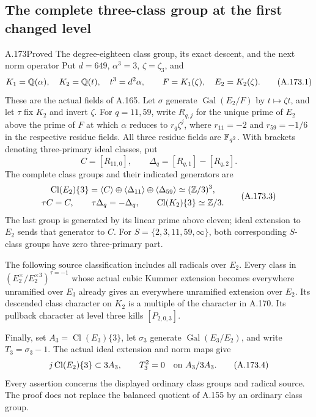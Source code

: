\subsection{The complete three-class group at the first changed level}

\begin{statement}{A.173}{Proved}
{The degree-eighteen class group, its exact descent, and the next norm operator}
Put \(d=649\), \(\alpha^3=3\), \(\zeta=\zeta_3\), and
\[
 K_1=\mathbb Q(\alpha),\quad K_2=\mathbb Q(t),\quad t^3=d^2\alpha,
 \qquad F=K_1(\zeta),\quad E_2=K_2(\zeta).
\tag{A.173.1}
\]
These are the actual fields of A.165.  Let \(\sigma\) generate
\(\operatorname{Gal}(E_2/F)\) by \(t\mapsto\zeta t\), and let
\(\tau\) fix \(K_2\) and invert \(\zeta\).
For \(q=11,59\), write \(R_{q,j}\) for the unique prime of
\(E_2\) above the prime of \(F\) at which
\(\alpha\) reduces to \(r_q\zeta^j\), where
\(r_{11}=-2\) and \(r_{59}=-1/6\) in the respective residue fields.
All three residue fields are \(\mathbb F_{q^2}\).
With brackets denoting three-primary ideal classes, put
\[
 C=[R_{11,0}],\qquad
 \Delta_q=[R_{q,1}]-[R_{q,2}].
\tag{A.173.2}
\]
The complete class groups and their indicated generators are
\[
 \begin{gathered}
 \operatorname{Cl}(E_2)\{3\}
    =\langle C\rangle\oplus\langle\Delta_{11}\rangle
                         \oplus\langle\Delta_{59}\rangle
    \simeq(\mathbb Z/3)^3,\\
 \tau C=C,\qquad \tau\Delta_q=-\Delta_q,\qquad
 \operatorname{Cl}(K_2)\{3\}\simeq\mathbb Z/3.
 \end{gathered}
\tag{A.173.3}
\]
The last group is generated by its linear prime above eleven;
ideal extension to \(E_2\) sends that generator to \(C\).
For \(S=\{2,3,11,59,\infty\}\), both corresponding
\(S\)-class groups have zero three-primary part.

The following source classification includes all radicals over
\(E_2\).  Every class in
\((E_2^\times/E_2^{\times3})^{\tau=-1}\) whose actual cubic
Kummer extension becomes everywhere unramified over \(E_3\)
already gives an everywhere unramified extension over \(E_2\).
Its descended class character on \(K_2\) is a multiple of the
character in A.170.  Its pullback character at level three kills
\([P_{2,0,3}]\).

Finally, set \(A_3=\operatorname{Cl}(E_3)\{3\}\), let
\(\sigma_3\) generate \(\operatorname{Gal}(E_3/E_2)\), and
write \(T_3=\sigma_3-1\).  The actual ideal extension and norm
maps give
\[
 j\operatorname{Cl}(E_2)\{3\}\subset3A_3,
 \qquad T_3^2=0\quad\hbox{on }A_3/3A_3.
\tag{A.173.4}
\]
Every assertion concerns the displayed ordinary class groups and
radical source.  The proof does not replace the balanced quotient
of A.155 by an ordinary class group.
\end{statement}


